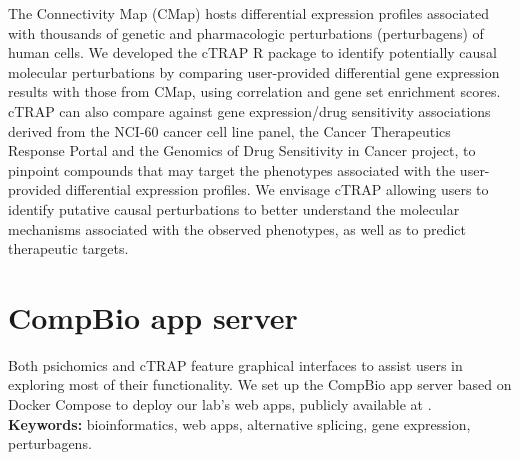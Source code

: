 The Connectivity Map (CMap) hosts differential expression profiles associated with thousands of genetic and pharmacologic perturbations (perturbagens) of human cells. We developed the cTRAP R package to identify potentially causal molecular perturbations by comparing user-provided differential gene expression results with those from CMap, using correlation and gene set enrichment scores. cTRAP can also compare against gene expression/drug sensitivity associations derived from the NCI-60 cancer cell line panel, the Cancer Therapeutics Response Portal and the Genomics of Drug Sensitivity in Cancer project, to pinpoint compounds that may target the phenotypes associated with the user-provided differential expression profiles. We envisage cTRAP allowing users to identify putative causal perturbations to better understand the molecular mechanisms associated with the observed phenotypes, as well as to predict therapeutic targets.

\section*{CompBio app server}

Both psichomics and cTRAP feature graphical interfaces to assist users in exploring most of their functionality. We set up the CompBio app server based on Docker Compose to deploy our lab's web apps, publicly available at .\\

\textbf{Keywords:} bioinformatics, web apps, alternative splicing, gene expression, perturbagens.

